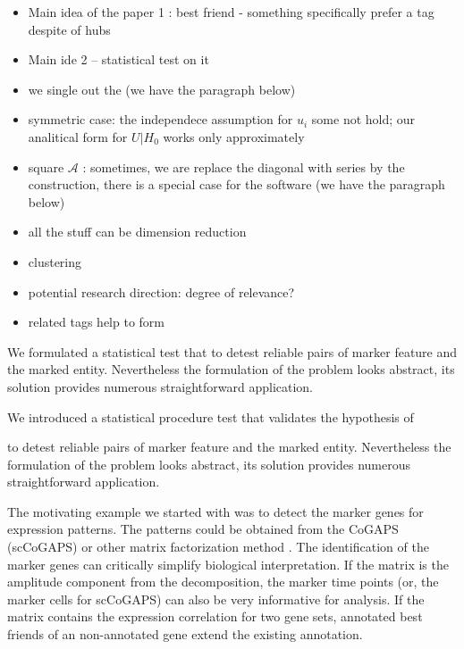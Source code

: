 \documentclass{llncs}
\begin{document}
\begin{itemize}
    \item Main idea of the paper 1 : best friend - something specifically prefer a tag despite of hubs
    \item Main ide 2 -- statistical test on it
    \item we single out the  (we have the paragraph below)
    \item symmetric case: the independece assumption for $u_i$ some not hold; our analitical form for $U | H_0$ works only approximately
    \item square $\mathcal{A}$ : sometimes, we are replace the diagonal with series by the construction, there is a special case for the software (we have the paragraph below)
    \item all the stuff can be dimension reduction
    \item clustering
    \item potential research direction: degree of relevance?
    \item related tags help to form 
\end{itemize}

We formulated a statistical test that to detest reliable pairs of marker feature and the marked entity. Nevertheless the formulation of the problem looks abstract, its solution provides numerous straightforward application. 

We introduced a statistical procedure test that
validates the hypothesis of 



to detest reliable pairs of marker feature and the marked entity. Nevertheless the formulation of the problem looks abstract, its solution provides numerous straightforward application. 





The motivating example we started with was to detect the marker genes for expression patterns. The patterns could be obtained from the CoGAPS (scCoGAPS) \cite{Fertig_2016} or other matrix factorization method \cite{Stein_2018}. The identification of the marker genes can critically simplify biological interpretation. If the matrix is the amplitude component from  the decomposition, the marker time points (or, the marker cells for scCoGAPS) can also be very informative for analysis. If the matrix contains the expression correlation for two gene sets, annotated best friends of an non-annotated gene extend the existing annotation.
\end{document}
